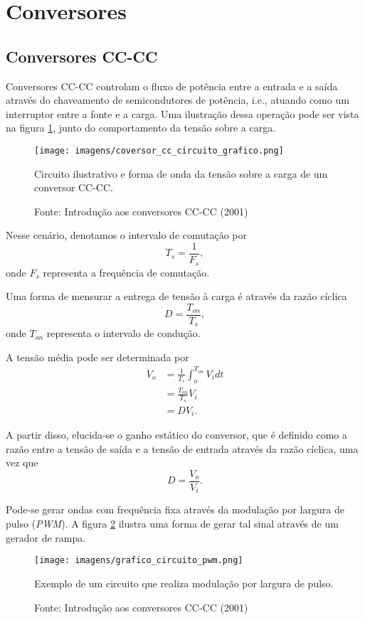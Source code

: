 \section{Conversores}



\subsection{Conversores CC-CC}

Conversores CC-CC controlam o fluxo de potência entre a entrada e a saída através do chaveamento de semicondutores de potência, i.e., atuando como um interruptor entre a fonte e a carga. Uma ilustração dessa operação pode ser vista na figura \ref{g0cc}, junto do comportamento da tensão sobre a carga.

\begin{figure}[h]
\center
\texttt{[image: imagens/coversor\_cc\_circuito\_grafico.png]}
\caption{Circuito ilustrativo e forma de onda da tensão sobre a carga de um conversor CC-CC.}\label{g0cc}  
\caption*{Fonte: Introdução aos conversores CC-CC (2001)}
\end{figure}

Nesse cenário, denotamos o intervalo de comutação por \[
    T_{s} = \frac{1}{F_{s}}
,\] onde $F_{s}$ representa a frequência de comutação.

Uma forma de mensurar a entrega de tensão à carga é através da razão cíclica \[
    D = \frac{T_{on}}{T_{s}}
,\] onde $T_{on}$ representa o intervalo de condução.

A tensão média pode ser determinada por
\begin{align*}
    V_{o} &= \frac{1}{T_{s}}\int_{o}^{T_{on}}V_{i}dt \\
    &= \frac{T_{on}}{T_{s}}V_{i}\\
    &= D V_i
.\end{align*}

A partir disso, elucida-se o ganho estático do conversor, que é definido como a razão entre a tensão de saída e a tensão de entrada através da razão cíclica, uma vez que \[
D = \frac{V_o}{V_i}
.\]

Pode-se gerar ondas com frequência fixa através da modulação por largura de pulso (\emph{PWM}). A figura \ref{gcp} ilustra uma forma de gerar tal sinal através de um gerador de rampa.

\begin{figure}[h]
\center
\texttt{[image: imagens/grafico\_circuito\_pwm.png]}
\caption{Exemplo de um circuito que realiza modulação por largura de pulso.}\label{gcp} 
\caption*{Fonte: Introdução aos conversores CC-CC (2001)}
\end{figure}

